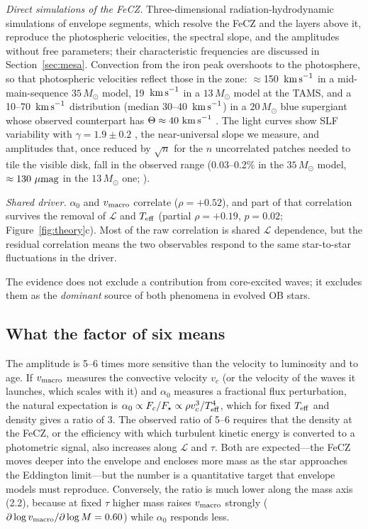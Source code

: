 \documentclass[twocolumn]{aastex631}
\newcommand{\vmac}{v_{\rm macro}}
\newcommand{\teff}{T_{\rm eff}}
\renewcommand{\ell}{\mathcal{L}}
\newcommand{\umag}{\mu{\rm mag}}
\newcommand{\kms}{{\rm km\,s}^{-1}}
\begin{document}
\emph{Direct simulations of the FeCZ.} Three-dimensional radiation-hydrodynamic simulations of envelope segments, which resolve the FeCZ and the layers above it, reproduce the photospheric velocities, the spectral slope, and the amplitudes without free parameters; their characteristic frequencies are discussed in Section~\ref{sec:mesa}. Convection from the iron peak overshoots to the photosphere, so that photospheric velocities reflect those in the zone: $\approx$150~$\kms$ in a mid-main-sequence $35\,M_\odot$ model, 19~$\kms$ in a $13\,M_\odot$ model at the TAMS, and a 10--70~$\kms$ distribution (median 30--40~$\kms$) in a $20\,M_\odot$ blue supergiant whose observed counterpart has $\Theta\approx40~\kms$ \citep{schultz2022,schultz2023,ma2026}. The light curves show SLF variability with $\gamma=1.9\pm0.2$ \citep{schultz2022}, the near-universal slope we measure, and amplitudes that, once reduced by $\sqrt{n}$ for the $n$ uncorrelated patches needed to tile the visible disk, fall in the observed range (0.03--0.2\% in the $35\,M_\odot$ model, $\approx130~\umag$ in the $13\,M_\odot$ one; \citealt{schultz2022,schultz2023}).

\emph{Shared driver.} $\alpha_0$ and $\vmac$ correlate ($\rho=+0.52$), and part of that correlation survives the removal of $\ell$ and $\teff$ (partial $\rho=+0.19$, $p=0.02$; Figure~\ref{fig:theory}c). Most of the raw correlation is shared $\ell$ dependence, but the residual correlation means the two observables respond to the same star-to-star fluctuations in the driver.

The evidence does not exclude a contribution from core-excited waves; it excludes them as the \emph{dominant} source of both phenomena in evolved OB stars.

\subsection{What the factor of six means}\label{sec:factor6}

The amplitude is 5--6 times more sensitive than the velocity to luminosity and to age. If $\vmac$ measures the convective velocity $v_c$ (or the velocity of the waves it launches, which scales with it) and $\alpha_0$ measures a fractional flux perturbation, the natural expectation is $\alpha_0\propto F_c/F_\star\propto\rho v_c^3/\teff^4$, which for fixed $\teff$ and density gives a ratio of 3. The observed ratio of 5--6 requires that the density at the FeCZ, or the efficiency with which turbulent kinetic energy is converted to a photometric signal, also increases along $\ell$ and $\tau$. Both are expected---the FeCZ moves deeper into the envelope and encloses more mass as the star approaches the Eddington limit---but the number is a quantitative target that envelope models must reproduce. Conversely, the ratio is much lower along the mass axis (2.2), because at fixed $\tau$ higher mass raises $\vmac$ strongly ($\partial\log\vmac/\partial\log M=0.60$) while $\alpha_0$ responds less.
\end{document}
